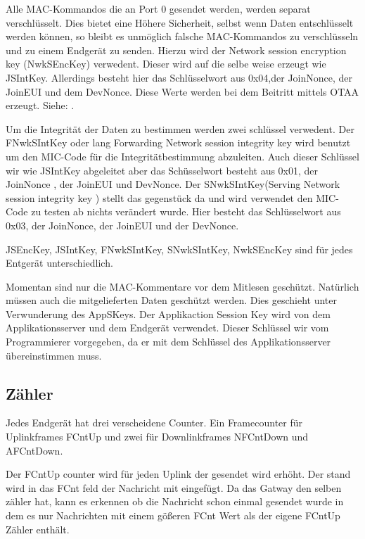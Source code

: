 \documentclass[a4paper,12pt]{article}
\begin{document}
            Alle MAC-Kommandos die an Port 0 gesendet werden, werden separat verschlüsselt. Dies bietet eine Höhere 
            Sicherheit, selbst wenn Daten entschlüsselt werden können, so bleibt es unmöglich falsche MAC-Kommandos zu 
            verschlüsseln und zu einem Endgerät zu senden. Hierzu wird der Network session encryption key (NwkSEncKey) 
            verwedent. Dieser wird auf die selbe weise erzeugt wie JSIntKey. Allerdings besteht hier das Schlüsselwort 
            aus 0x04,der JoinNonce, der JoinEUI und dem DevNonce. Diese Werte werden bei dem Beitritt mittels OTAA 
            erzeugt. Siehe: .

            Um die Integrität der Daten zu bestimmen werden zwei schlüssel verwedent. Der FNwkSIntKey oder lang Forwarding 
            Network session integrity key wird benutzt um den MIC-Code für die Integritätbestimmung abzuleiten. Auch 
            dieser Schlüssel wir wie JSIntKey abgeleitet aber das Schüsselwort besteht aus 0x01, der JoinNonce , der 
            JoinEUI und DevNonce. Der SNwkSIntKey(Serving Network session integrity key ) stellt das gegenstück da und 
            wird verwendet den MIC-Code zu testen ab nichts verändert wurde. Hier besteht das Schlüsselwort aus 0x03, der 
            JoinNonce, der JoinEUI und der DevNonce.

            JSEncKey, JSIntKey, FNwkSIntKey, SNwkSIntKey, NwkSEncKey sind für jedes Entgerät unterschiedlich.

            Momentan sind nur die MAC-Kommentare vor dem Mitlesen geschützt. Natürlich müssen auch die mitgelieferten 
            Daten geschützt werden. Dies geschieht unter Verwunderung des AppSKeys. Der Applikaction Session Key wird von 
            dem Applikationsserver und dem Endgerät verwendet. Dieser Schlüssel wir vom Programmierer vorgegeben, da er 
            mit dem Schlüssel des Applikationsserver übereinstimmen muss.\cite[S.50 ff]{LoRaSpec}

        \subsection{Zähler}
            Jedes Endgerät hat drei verscheidene Counter. Ein Framecounter für Uplinkframes FCntUp und zwei für 
            Downlinkframes NFCntDown und AFCntDown. 

            Der FCntUp counter wird für jeden Uplink der gesendet wird erhöht. Der stand wird in das FCnt feld der 
            Nachricht mit eingefügt. Da das Gatway den selben zähler hat, kann es erkennen ob die Nachricht schon einmal 
            gesendet wurde in dem es nur Nachrichten mit einem gößeren FCnt Wert als der eigene FCntUp Zähler enthält.
\end{document}
